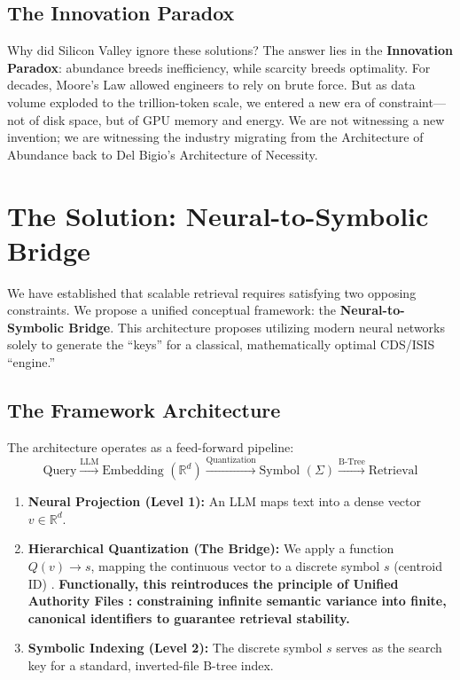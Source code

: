 \documentclass[manuscript,screen,nonacm]{acmart}
\begin{document}
\subsection{The Innovation Paradox}
Why did Silicon Valley ignore these solutions? The answer lies in the \textbf{Innovation Paradox}: abundance breeds inefficiency, while scarcity breeds optimality. For decades, Moore's Law allowed engineers to rely on brute force. But as data volume exploded to the trillion-token scale, we entered a new era of constraint---not of disk space, but of GPU memory and energy. We are not witnessing a new invention; we are witnessing the industry migrating from the Architecture of Abundance back to Del Bigio's Architecture of Necessity.

\section{The Solution: Neural-to-Symbolic Bridge}

We have established that scalable retrieval requires satisfying two opposing constraints. We propose a unified conceptual framework: the \textbf{Neural-to-Symbolic Bridge}. This architecture proposes utilizing modern neural networks solely to generate the ``keys'' for a classical, mathematically optimal CDS/ISIS ``engine.''

\subsection{The Framework Architecture}
The architecture operates as a feed-forward pipeline:
\[ \text{Query} \xrightarrow{\text{LLM}} \text{Embedding } (\mathbb{R}^d) \xrightarrow{\text{Quantization}} \text{Symbol } (\Sigma) \xrightarrow{\text{B-Tree}} \text{Retrieval} \]

\begin{enumerate}
    \item \textbf{Neural Projection (Level 1):} An LLM maps text into a dense vector $v \in \mathbb{R}^d$.
    \item \textbf{Hierarchical Quantization (The Bridge):} We apply a function $Q(v) \rightarrow s$, mapping the continuous vector to a discrete symbol $s$ (centroid ID) \cite{zandieh2025}. \textbf{Functionally, this reintroduces the principle of Unified Authority Files \cite{caprazli2003}: constraining infinite semantic variance into finite, canonical identifiers to guarantee retrieval stability.}
    \item \textbf{Symbolic Indexing (Level 2):} The discrete symbol $s$ serves as the search key for a standard, inverted-file B-tree index.
\end{enumerate}
\end{document}
